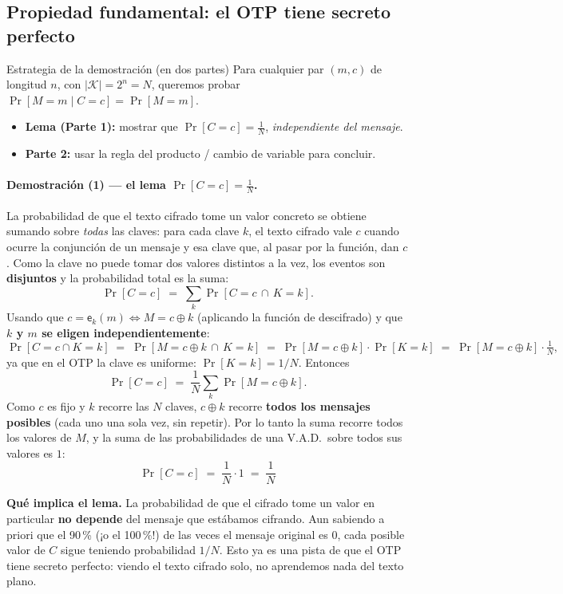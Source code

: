 \documentclass[11pt,a4paper]{article}
\newcommand{\Kset}{\mathcal{K}}
\newcommand{\xor}{\oplus}
\newcommand{\E}{\mathsf{e}}
\begin{document}
\subsection{Propiedad fundamental: el OTP tiene secreto perfecto}

\begin{practbox}{Estrategia de la demostración (en dos partes)}
Para cualquier par $(m,c)$ de longitud $n$, con $|\Kset|=2^n=N$, queremos probar
$\Pr[M{=}m\mid C{=}c]=\Pr[M{=}m]$.
\begin{itemize}[leftmargin=1.3em,itemsep=2pt]
  \item \textbf{Lema (Parte 1):} mostrar que $\Pr[C=c]=\tfrac1N$, \emph{independiente del
        mensaje}.
  \item \textbf{Parte 2:} usar la regla del producto / cambio de variable para concluir.
\end{itemize}
\end{practbox}

\paragraph{Demostración (1) — el lema $\Pr[C=c]=\tfrac1N$.}
La probabilidad de que el texto cifrado tome un valor concreto se obtiene sumando sobre
\emph{todas} las claves: para cada clave $k$, el texto cifrado vale $c$ cuando ocurre la
conjunción de un mensaje y esa clave que, al pasar por la función, dan $c$. Como la clave
no puede tomar dos valores distintos a la vez, los eventos son \textbf{disjuntos} y la
probabilidad total es la suma:
\[
  \Pr[C=c] \;=\; \sum_{k}\Pr[C=c \,\cap\, K=k].
\]
Usando que $c=\E_k(m)\iff M = c\xor k$ (aplicando la función de descifrado) y que
\textbf{$k$ y $m$ se eligen independientemente}:
\[
  \Pr[C=c\cap K=k] \;=\; \Pr[M=c\xor k \,\cap\, K=k]
  \;=\; \Pr[M=c\xor k]\cdot\Pr[K=k] \;=\; \Pr[M=c\xor k]\cdot \tfrac1N,
\]
ya que en el OTP la clave es uniforme: $\Pr[K=k]=1/N$. Entonces
\[
  \Pr[C=c] \;=\; \frac1N\sum_{k}\Pr[M=c\xor k].
\]
Como $c$ es fijo y $k$ recorre las $N$ claves, $c\xor k$ recorre \textbf{todos los
mensajes posibles} (cada uno una sola vez, sin repetir). Por lo tanto la suma recorre
todos los valores de $M$, y la suma de las probabilidades de una V.A.D.\ sobre todos sus
valores es $1$:
\[
  \boxed{\ \Pr[C=c] \;=\; \frac1N\cdot 1 \;=\; \frac1N\ }
\]

\begin{slidebox}
\textbf{Qué implica el lema.} La probabilidad de que el cifrado tome un valor en
particular \textbf{no depende} del mensaje que estábamos cifrando. Aun sabiendo a priori
que el 90\,\% (¡o el 100\,\%!) de las veces el mensaje original es $0$, cada posible
valor de $C$ sigue teniendo probabilidad $1/N$. Esto ya es una pista de que el OTP tiene
secreto perfecto: viendo el texto cifrado solo, no aprendemos nada del texto plano.
\end{slidebox}
\end{document}

